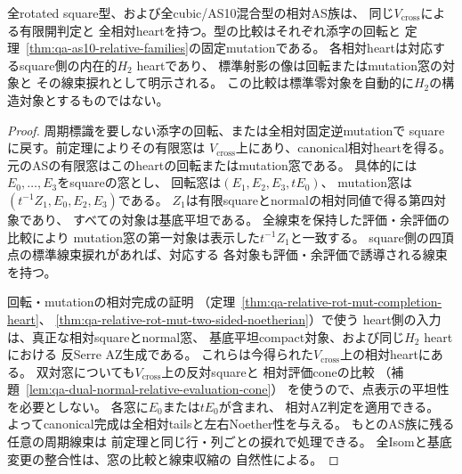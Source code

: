 \begin{corollary}
\label{cor:qa-all-relative-as-type-hearts}
全rotated square型、および全cubic/AS10混合型の相対AS族は、
同じ$V_{\mathrm{cross}}$による有限開判定と
全相対heartを持つ。型の比較はそれぞれ添字の回転と
定理~\ref{thm:qa-as10-relative-families}の固定mutationである。
各相対heartは対応するsquare側の内在的$H_2$ heartであり、
標準射影の像は回転またはmutation窓の対象と
その線束捩れとして明示される。
この比較は標準零対象を自動的に$H_2$の構造対象とするものではない。
\end{corollary}
\begin{proof}
周期標識を要しない添字の回転、または全相対固定逆mutationで
squareに戻す。前定理によりその有限窓は
$V_{\mathrm{cross}}$上にあり、canonical相対heartを得る。
元のASの有限窓はこのheartの回転またはmutation窓である。
具体的には$E_0,\ldots,E_3$をsquareの窓とし、
回転窓は$(E_1,E_2,E_3,tE_0)$、
mutation窓は$(t^{-1}Z_1,E_0,E_2,E_3)$である。
$Z_1$は有限squareとnormalの相対同値で得る第四対象であり、
すべての対象は基底平坦である。
全線束を保持した評価・余評価の比較により
mutation窓の第一対象は表示した$t^{-1}Z_1$と一致する。
square側の四頂点の標準線束捩れがあれば、対応する
各対象も評価・余評価で誘導される線束を持つ。

回転・mutationの相対完成の証明
（定理~\ref{thm:qa-relative-rot-mut-completion-heart}、
\ref{thm:qa-relative-rot-mut-two-sided-noetherian}）で使う
heart側の入力は、真正な相対squareとnormal窓、
基底平坦compact対象、および同じ$H_2$ heartにおける
反Serre AZ生成である。
これらは今得られた$V_{\mathrm{cross}}$上の相対heartにある。
双対窓についても$V_{\mathrm{cross}}$上の反対squareと
相対評価coneの比較
（補題~\ref{lem:qa-dual-normal-relative-evaluation-cone}）
を使うので、点表示の平坦性を必要としない。
各窓に$E_0$または$tE_0$が含まれ、
相対AZ判定を適用できる。
よってcanonical完成は全相対tailsと左右Noether性を与える。
もとのAS族に残る任意の周期線束は
前定理と同じ行・列ごとの捩れで処理できる。
全Isomと基底変更の整合性は、窓の比較と線束収縮の
自然性による。
\end{proof}

